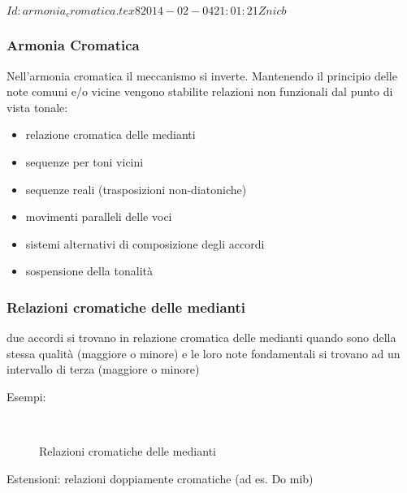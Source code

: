 %
%
\svnInfo $Id: armonia_cromatica.tex 8 2014-02-04 21:01:21Z nicb $

\begin{frame}
    \frametitle{Armonia Cromatica}

    Nell'armonia cromatica il meccanismo si inverte.
    Mantenendo il principio delle note comuni e/o vicine
    vengono stabilite relazioni non funzionali dal punto di vista tonale:

    \begin{itemize}

        \item relazione cromatica delle medianti
        \item sequenze per toni vicini
        \item sequenze reali (trasposizioni non-diatoniche)
        \item movimenti paralleli delle voci
        \item sistemi alternativi di composizione degli accordi
        \item sospensione della tonalit\`a

    \end{itemize}

\end{frame}

\begin{frame}
    \frametitle{Relazioni cromatiche delle medianti}

    \begin{itemize}
    {\scriptsize

        \item due accordi si trovano in relazione cromatica
            delle medianti quando sono della stessa qualit\`a (maggiore o minore)
            e le loro note fondamentali si trovano ad un intervallo di terza
            (maggiore o minore) 

        \item Esempi:

            \begin{center}
                \begin{figure}
                    \\[0.25\baselineskip]
                    \caption{\scriptsize Relazioni cromatiche delle medianti}
                \end{figure}
            \end{center}

        \item {} 
        \item Estensioni: relazioni doppiamente cromatiche (ad es. Do mib)

    }
    \end{itemize}

\end{frame}
